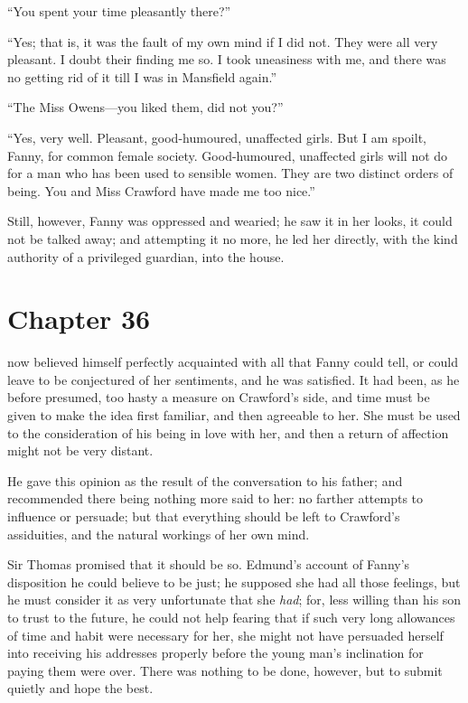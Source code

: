 ``You spent your time pleasantly there?''

``Yes; that is, it was the fault of my own mind if I did not.
They were all very pleasant.  I doubt their finding me so.
I took uneasiness with me, and there was no getting rid
of it till I was in Mansfield again.''

``The Miss Owens---you liked them, did not you?''

``Yes, very well.  Pleasant, good-humoured, unaffected girls.
But I am spoilt, Fanny, for common female society.
Good-humoured, unaffected girls will not do for a man
who has been used to sensible women.  They are two distinct
orders of being.  You and Miss Crawford have made me
too nice.''

Still, however, Fanny was oppressed and wearied;
he saw it in her looks, it could not be talked away;
and attempting it no more, he led her directly, with the
kind authority of a privileged guardian, into the house.



\chapter{Chapter 36}

 now believed himself perfectly acquainted with all
that Fanny could tell, or could leave to be conjectured
of her sentiments, and he was satisfied.  It had been,
as he before presumed, too hasty a measure on Crawford's side,
and time must be given to make the idea first familiar,
and then agreeable to her.  She must be used to the
consideration of his being in love with her, and then
a return of affection might not be very distant.

He gave this opinion as the result of the conversation
to his father; and recommended there being nothing more said
to her:  no farther attempts to influence or persuade;
but that everything should be left to Crawford's assiduities,
and the natural workings of her own mind.

Sir Thomas promised that it should be so.  Edmund's account
of Fanny's disposition he could believe to be just;
he supposed she had all those feelings, but he must consider
it as very unfortunate that she \emph{had}; for, less willing
than his son to trust to the future, he could not help
fearing that if such very long allowances of time and habit
were necessary for her, she might not have persuaded
herself into receiving his addresses properly before
the young man's inclination for paying them were over.
There was nothing to be done, however, but to submit
quietly and hope the best.

